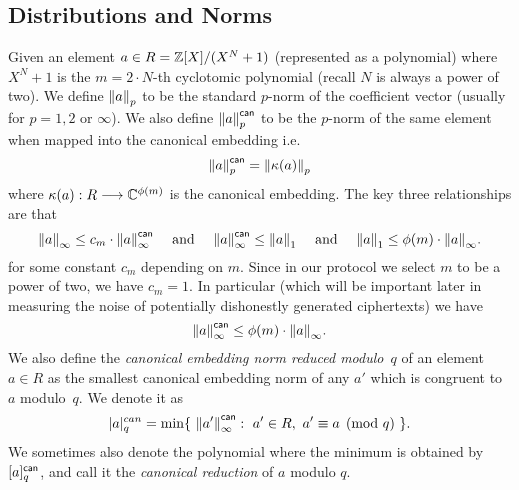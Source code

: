 \subsection{Distributions and Norms}
Given an element $a \in R = {\mathbb{Z}}[X]/(X^{N}+1)$ (represented as a polynomial)
where $X^N+1$ is the $m=2 \cdot N$-th cyclotomic polynomial
(recall $N$ is always a power of two).
We define ${\Vert a \Vert}_p$ to be the standard $p$-norm
of the coefficient vector (usually for $p=1, 2$ or $\infty$).
We also define ${\Vert a \Vert}_p^{\mathsf{can}}$ to be the $p$-norm 
of the same element when mapped into the canonical embedding
i.e.
\[  {\Vert a \Vert}_p^{\mathsf{can}} = {\Vert \kappa(a) \Vert}_p \]
where $\kappa(a): R \longrightarrow \mathbb{C}^{\phi(m)}$ is the
canonical embedding.
The key three relationships are that 
\[ {\Vert a \Vert}_\infty \le c_m \cdot {\Vert a \Vert}_\infty^{\mathsf{can}} \quad
   \mbox{  and  } \quad
   {\Vert a \Vert}_\infty^{\mathsf{can}} \le {\Vert a \Vert}_1  \quad
   \mbox{  and  } \quad
   {\Vert a \Vert}_1 \le \phi(m) \cdot {\Vert a \Vert}_\infty.
\]
for some constant $c_m$ depending on $m$.
Since in our protocol we select $m$ to be a power of two, we have $c_m=1$.
In particular (which will be important later in measuring the
noise of potentially dishonestly generated ciphertexts) we have
\[ {\Vert a \Vert}_{\infty}^{\mathsf{can}} \le \phi(m) \cdot {\Vert a \Vert}_{\infty}. \]
We also define the \emph{canonical embedding norm reduced modulo~$q$} 
of an element $a\in R$ as the smallest canonical embedding norm of any
$a'$ which is congruent to $a$ modulo~$q$. We denote it as
\[
|a|_q^{can} = \min
  \{~{\Vert a' \Vert}_\infty^{\mathsf{can}} :~ a'\in R,~ a' \equiv a \pmod{q}~\}.
\]
We sometimes also denote the polynomial where the minimum is obtained
by $[a]_q^{\mathsf{can}}$, and call it the {\em canonical reduction} of
$a$ modulo $q$. 

